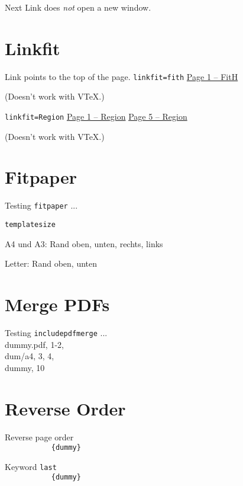 \documentclass[a4paper]{article}
\begin{document}
\begingroup
Next Link does \emph{not} open a new window.

\endgroup

\section{Linkfit}
\begingroup
Link points to the top of the page. \texttt{linkfit=fith}
\hyperlink{dummy.pdf.1}{Page 1 -- FitH}
\par(Doesn't work with VTeX.)

\texttt{linkfit=Region}
\hyperlink{foobar.1}{Page 1 -- Region}
\hyperlink{foobar.5}{Page 5 -- Region}
\par(Doesn't work with VTeX.)

\endgroup

\section{Fitpaper}
\begingroup
Testing \texttt{fitpaper} ...

%
\texttt{templatesize}
\par A4 und A3: Rand oben, unten, rechts, links
\par Letter: Rand oben, unten

\endgroup


\section{Merge PDFs}
\begingroup
Testing \texttt{includepdfmerge} ...
\\dummy.pdf, 1-2, \\dum/a4, 3, 4, \\dummy, 10
\endgroup


\section{Reverse Order}
\begingroup
Reverse page order\\
\verb||
\verb|           {dummy}|

Keyword \verb|last|\\
\verb||
\verb|           {dummy}|

\endgroup
\end{document}
